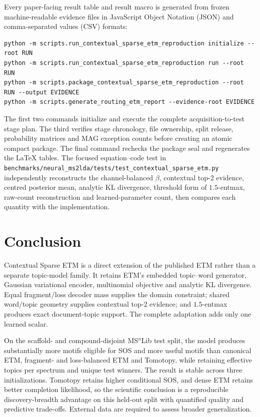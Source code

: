 \documentclass[10pt,a4paper]{article}
\begin{document}
Every paper-facing result table and result macro is generated from frozen
machine-readable evidence files in JavaScript Object Notation (JSON) and
comma-separated values (CSV) formats:
\begin{verbatim}
python -m scripts.run_contextual_sparse_etm_reproduction initialize --root RUN
python -m scripts.run_contextual_sparse_etm_reproduction run --root RUN
python -m scripts.package_contextual_sparse_etm_reproduction --root RUN --output EVIDENCE
python -m scripts.generate_routing_etm_report --evidence-root EVIDENCE
\end{verbatim}
The first two commands initialize and execute the complete acquisition-to-test
stage plan. The third verifies stage chronology, file ownership, split release,
probability matrices and MAG exception counts before creating an atomic compact
package. The final command rechecks the package seal and regenerates the LaTeX
tables.
The focused equation--code test in
\texttt{benchmarks/neural\_ms2lda/tests/test\_contextual\_sparse\_etm.py} independently
reconstructs the channel-balanced $\beta$, contextual top-2 evidence, centred
posterior mean, analytic KL divergence, threshold form of $1.5$-entmax, raw-count
reconstruction and learned-parameter count, then compares each quantity with
the implementation.

\section{Conclusion}

Contextual Sparse ETM is a direct extension of the published ETM rather than a
separate topic-model family. It retains ETM's embedded topic--word generator,
Gaussian variational encoder, multinomial objective and analytic KL divergence.
Equal
fragment/loss decoder mass supplies the domain constraint; shared word/topic
geometry supplies contextual top-2 evidence; and $1.5$-entmax produces exact
document-topic support. The complete adaptation adds only one learned scalar.

On the scaffold- and compound-disjoint MS$^{n}$Lib test split, the model produces
substantially more motifs eligible for SOS and more useful motifs than canonical ETM,
fragment- and loss-balanced ETM and Tomotopy, while retaining
\MedianEffectiveTopics{} effective topics per spectrum and
\UniqueTopOneTopics{} unique test winners.
The result is stable across three initializations. Tomotopy retains higher
conditional SOS, and dense ETM retains better completion likelihood, so the
scientific conclusion is a reproducible discovery-breadth advantage on this
held-out split with quantified quality and predictive trade-offs. External data
are required to assess broader generalization.
\end{document}
